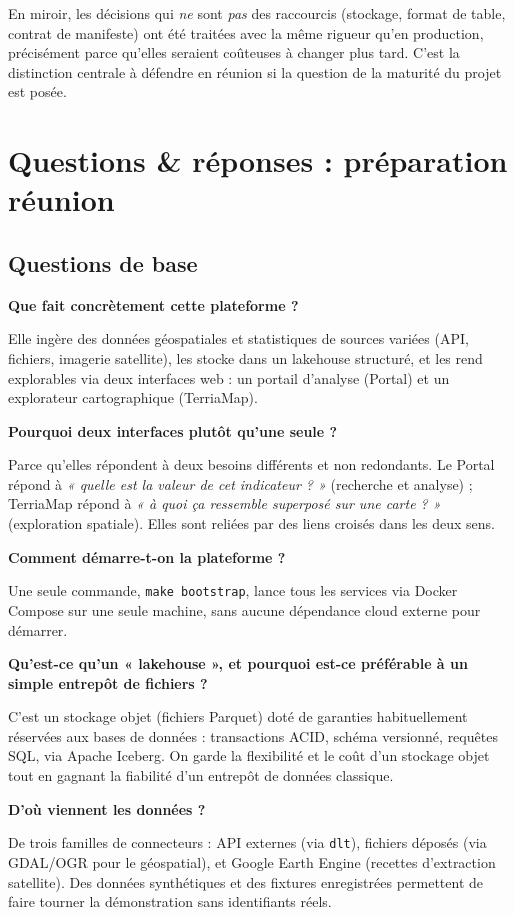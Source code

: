 \documentclass[11pt,a4paper]{article}
\newcommand{\question}[1]{\par\vspace{9pt}\headingfont\bfseries\color{navy} #1\par\vspace{2pt}\normalfont\rmfamily\color{darktext}}
\begin{document}
\begin{note}
En miroir, les décisions qui \emph{ne} sont \emph{pas} des raccourcis (stockage, format de table, contrat de manifeste) ont été traitées avec la même rigueur qu'en production, précisément parce qu'elles seraient coûteuses à changer plus tard. C'est la distinction centrale à défendre en réunion si la question de la maturité du projet est posée.
\end{note}

\clearpage

\section{Questions \& réponses : préparation réunion}

\subsection{Questions de base}

\question{Que fait concrètement cette plateforme ?}
Elle ingère des données géospatiales et statistiques de sources variées (API, fichiers, imagerie satellite), les stocke dans un lakehouse structuré, et les rend explorables via deux interfaces web : un portail d'analyse (Portal) et un explorateur cartographique (TerriaMap).

\question{Pourquoi deux interfaces plutôt qu'une seule ?}
Parce qu'elles répondent à deux besoins différents et non redondants. Le Portal répond à \emph{« quelle est la valeur de cet indicateur ? »} (recherche et analyse) ; TerriaMap répond à \emph{« à quoi ça ressemble superposé sur une carte ? »} (exploration spatiale). Elles sont reliées par des liens croisés dans les deux sens.

\question{Comment démarre-t-on la plateforme ?}
Une seule commande, \texttt{make bootstrap}, lance tous les services via Docker Compose sur une seule machine, sans aucune dépendance cloud externe pour démarrer.

\question{Qu'est-ce qu'un « lakehouse », et pourquoi est-ce préférable à un simple entrepôt de fichiers ?}
C'est un stockage objet (fichiers Parquet) doté de garanties habituellement réservées aux bases de données : transactions ACID, schéma versionné, requêtes SQL, via Apache Iceberg. On garde la flexibilité et le coût d'un stockage objet tout en gagnant la fiabilité d'un entrepôt de données classique.

\question{D'où viennent les données ?}
De trois familles de connecteurs : API externes (via \texttt{dlt}), fichiers déposés (via GDAL/OGR pour le géospatial), et Google Earth Engine (recettes d'extraction satellite). Des données synthétiques et des fixtures enregistrées permettent de faire tourner la démonstration sans identifiants réels.
\end{document}
